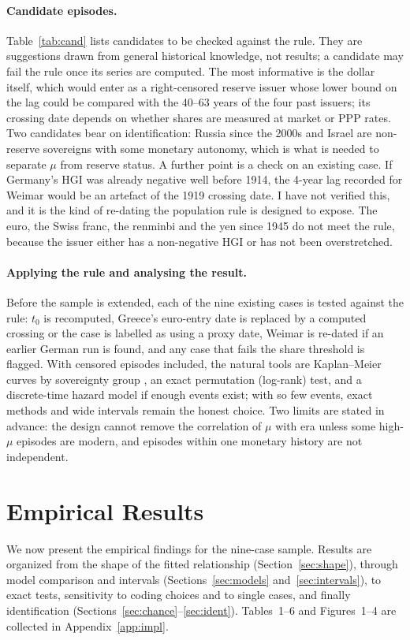 \documentclass[11pt,letterpaper]{article}
\theoremstyle{definition}
\theoremstyle{plain}
\begin{document}
\paragraph{Candidate episodes.} Table~\ref{tab:cand} lists candidates to be checked against the rule. They are suggestions drawn from general historical knowledge, not results; a candidate may fail the rule once its series are computed. The most informative is the dollar itself, which would enter as a right-censored reserve issuer whose lower bound on the lag could be compared with the 40--63 years of the four past issuers; its crossing date depends on whether shares are measured at market or PPP rates. Two candidates bear on identification: Russia since the 2000s and Israel are non-reserve sovereigns with some monetary autonomy, which is what is needed to separate $\mu$ from reserve status. A further point is a check on an existing case. If Germany's HGI was already negative well before 1914, the 4-year lag recorded for Weimar would be an artefact of the 1919 crossing date. I have not verified this, and it is the kind of re-dating the population rule is designed to expose. The euro, the Swiss franc, the renminbi and the yen since 1945 do not meet the rule, because the issuer either has a non-negative HGI or has not been overstretched.

\paragraph{Applying the rule and analysing the result.} Before the sample is extended, each of the nine existing cases is tested against the rule: $t_0$ is recomputed, Greece's euro-entry date is replaced by a computed crossing or the case is labelled as using a proxy date, Weimar is re-dated if an earlier German run is found, and any case that fails the share threshold is flagged. With censored episodes included, the natural tools are Kaplan--Meier curves by sovereignty group \citep{kaplan1958}, an exact permutation (log-rank) test, and a discrete-time hazard model if enough events exist; with so few events, exact methods and wide intervals remain the honest choice. Two limits are stated in advance: the design cannot remove the correlation of $\mu$ with era unless some high-$\mu$ episodes are modern, and episodes within one monetary history are not independent.

\section{Empirical Results}\label{sec:results}
We now present the empirical findings for the nine-case sample. Results are organized from the shape of the fitted relationship (Section~\ref{sec:shape}), through model comparison and intervals (Sections~\ref{sec:models} and~\ref{sec:intervals}), to exact tests, sensitivity to coding choices and to single cases, and finally identification (Sections~\ref{sec:chance}--\ref{sec:ident}). Tables~1--6 and Figures~1--4 are collected in Appendix~\ref{app:impl}.
\end{document}
